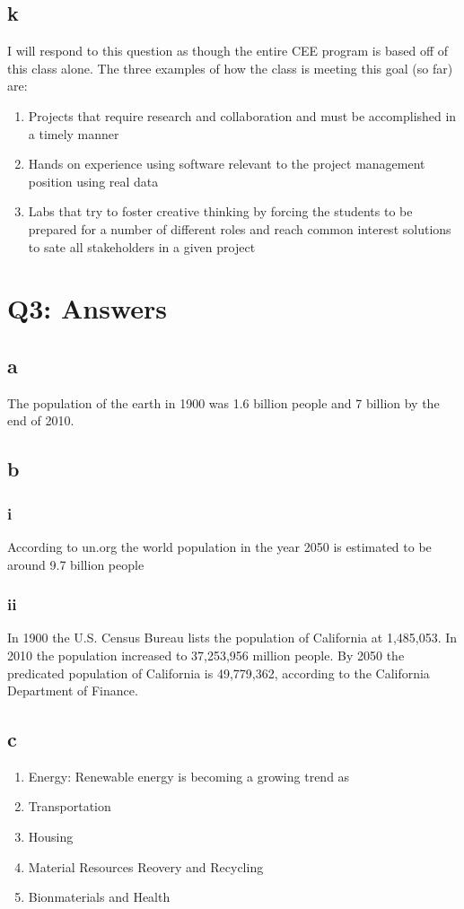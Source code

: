\documentclass[12pt]{article} %
\begin{document}
	\subsection{k}
		I will respond to this question as though the entire CEE program is based off of this class alone. The three examples of how the class is meeting this goal (so far) are:
		\begin{enumerate}
			\item Projects that require research and collaboration and must be accomplished in a timely manner
			\item Hands on experience using software relevant to the project management position using real data
			\item Labs that try to foster creative thinking by forcing the students to be prepared for a number of different roles and reach common interest solutions to sate all stakeholders in a given project
		\end{enumerate}


\section{Q3: Answers}

	\subsection{a}
		The population of the earth in 1900 was 1.6 billion people and 7 billion by the end of 2010.

	\subsection{b}
		\subsubsection{i}
			According to un.org the world population in the year 2050 is estimated to be around 9.7 billion people
		\subsubsection{ii}
			In 1900 the U.S. Census Bureau lists the population of California at 1,485,053. In 2010 the population increased to 37,253,956 million people. By 2050 the predicated population of California is 49,779,362, according to the California Department of Finance.

	\subsection{c}
		\begin{enumerate}
			\item Energy: Renewable energy is becoming a growing trend as 
			\item Transportation
			\item Housing
			\item Material Resources Reovery and Recycling
			\item Bionmaterials and Health
		\end{enumerate}
\end{document}
